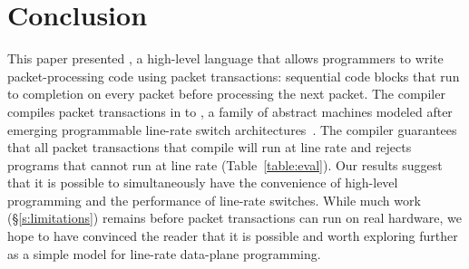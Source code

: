 \section{Conclusion}
\label{s:conclusion}

This paper presented \pktlanguage, a high-level language that allows
programmers to write packet-processing code using packet transactions:
sequential code blocks that run to completion on every packet before processing
the next packet. The \pktlanguage compiler compiles packet transactions in
\pktlanguage to \absmachine, a family of abstract machines modeled after
emerging programmable line-rate switch architectures~\cite{flexpipe, xpliant,
rmt}. The compiler guarantees that all packet transactions that compile will
run at line rate and rejects \pktlanguage programs that cannot run at line rate
(Table~\ref{table:eval}). Our results suggest that it is possible to
simultaneously have the convenience of high-level programming and the
performance of line-rate switches. While much work (\S\ref{s:limitations})
remains before packet transactions can run on real hardware, we hope to have
convinced the reader that it is possible and worth exploring further as a
simple model for line-rate data-plane programming.
